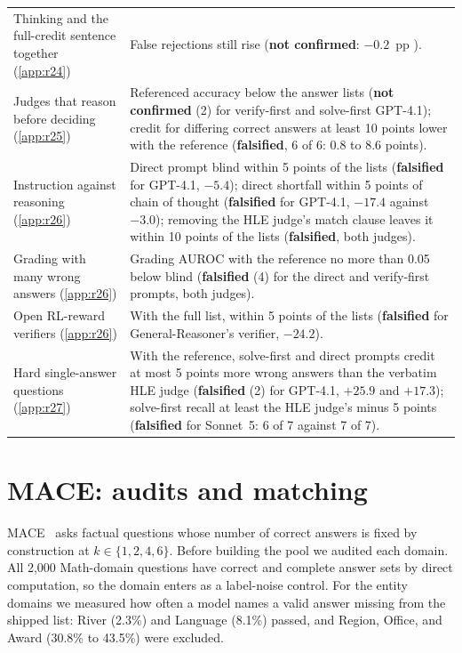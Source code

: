 {\begin{longtable}{L{3.5cm}L{9.5cm}}
Thinking and the full-credit sentence together (\cref{app:r24}) & False rejections still rise (\textbf{not confirmed}: $-0.2$~pp ). \\
Judges that reason before deciding (\cref{app:r25}) & Referenced accuracy below the answer lists (\textbf{not confirmed} (2) for verify-first and solve-first GPT-4.1); credit for differing correct answers at least 10 points lower with the reference (\textbf{falsified}, 6 of 6: 0.8 to 8.6 points). \\
Instruction against reasoning (\cref{app:r26}) & Direct prompt blind within 5 points of the lists (\textbf{falsified} for GPT-4.1, $-5.4$); direct shortfall within 5 points of chain of thought (\textbf{falsified} for GPT-4.1, $-17.4$ against $-3.0$); removing the HLE judge's match clause leaves it within 10 points of the lists (\textbf{falsified}, both judges). \\
Grading with many wrong answers (\cref{app:r26}) & Grading AUROC with the reference no more than 0.05 below blind (\textbf{falsified} (4) for the direct and verify-first prompts, both judges). \\
Open RL-reward verifiers (\cref{app:r26}) & With the full list, within 5 points of the lists (\textbf{falsified} for General-Reasoner's verifier, $-24.2$). \\
Hard single-answer questions (\cref{app:r27}) & With the reference, solve-first and direct prompts credit at most 5 points more wrong answers than the verbatim HLE judge (\textbf{falsified} (2) for GPT-4.1, $+25.9$ and $+17.3$); solve-first recall at least the HLE judge's minus 5 points (\textbf{falsified} for Sonnet~5: 6 of 7 against 7 of 7). \\
\end{longtable}
}

\FloatBarrier
\section{\textsc{MACE}: audits and matching}
\label{app:mace}

\textsc{MACE}~\citep{mace2026} asks factual questions whose number of correct answers is fixed by construction at $k \in \{1,2,4,6\}$. Before building the pool we audited each domain. All 2,000 Math-domain questions have correct and complete answer sets by direct computation, so the domain enters as a label-noise control. For the entity domains we measured how often a model names a valid answer missing from the shipped list: River (2.3\%) and Language (8.1\%) passed, and Region, Office, and Award (30.8\% to 43.5\%) were excluded.


